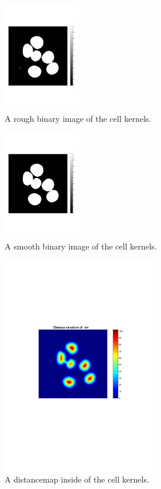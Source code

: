 \documentclass[10pt,twocolumn]{article}
\begin{document}
\begin{figure}[ht]
\centering
\includegraphics[width=0.3\textwidth]{Bilder/ThershholdedKernels.pdf}
\caption{A rough binary image of the cell kernels.}
\label{fig:CellKernelsThreshRough}
\end{figure}

\begin{figure}[ht]
\centering
\includegraphics[width=0.3\textwidth]{Bilder/BWCleanKernels.pdf}
\caption{A smooth binary image of the cell kernels.}
\label{fig:CellKernelsThresSmooth}
\end{figure}

\begin{figure}[ht]
\centering
\includegraphics[width=0.6\textwidth]{Bilder/DistanceTransformInsideKernels.pdf}
\caption{A distancemap inside of the cell kernels.}
\label{fig:CellKernelsDist}
\end{figure}
\end{document}
